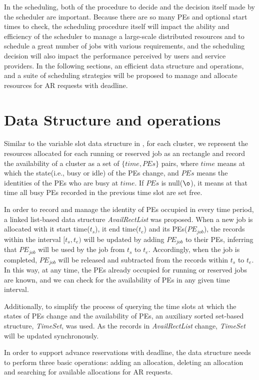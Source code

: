 \documentclass[preprint,12pt]{elsarticle}
\begin{document}
In the scheduling, both of the procedure to decide and the decision itself made by the scheduler are important. Because there are so many PEs and optional start times to check, the scheduling procedure itself will impact the ability and efficiency of the scheduler to manage a large-scale distributed resources and to schedule a great number of jobs with various requirements, and the scheduling decision will also impact the performance perceived by users and service providers. In the following sections, an efficient data structure and operations, and a suite of scheduling strategies will be proposed to manage and allocate resources for AR requests with deadline.


\section{Data Structure and operations}

Similar to the variable slot data structure in \cite{kunrath2008towards}, for each cluster, we represent the resources allocated for each running or reserved job as an rectangle and record the availability of a cluster as a set of $\{time, PEs\}$ pairs, where $time$ means at which the state(i.e., busy or idle) of the PEs change, and $PEs$ means the identities of the PEs who are busy at $time$. If $PEs$ is null($\o$), it means at that time all busy PEs recorded in the previous time slot are set free.

In order to record and manage the identity of PEs occupied in every time period, a linked list-based data structure \emph{AvailRectList} was proposed. When a new job is allocated with it start time($t_s$), it end time($t_e$) and its PEs($PE_{job}$), the records within the interval $[t_s,t_e)$ will be updated by adding $PE_{job}$ to their PEs, inferring that $PE_{job}$ will be used by the job from $t_s$ to $t_e$. Accordingly, when the job is completed, $PE_{job}$ will be released and subtracted from the records within $t_s$ to $t_e$. In this way, at any time, the PEs already occupied for running or reserved jobs are known, and we can check for the availability of PEs in any given time interval.

Additionally, to simplify the process of querying the time slots at which the states of PEs change and the availability of PEs, an auxiliary sorted set-based structure, {\em TimeSet}, was used. As the records in \emph{AvailRectList} change, {\em TimeSet} will be updated synchronously.

In order to support advance reservations with deadline, the data structure needs to perform three basic operations: adding an allocation, deleting an allocation and searching for available allocations for AR requests.
\end{document}
